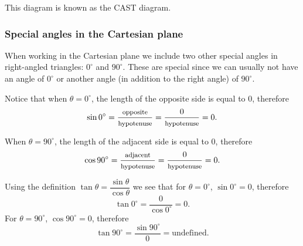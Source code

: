 This diagram is known as the CAST diagram.

\subsubsection{Special angles in the Cartesian plane}
When working in the Cartesian plane we include two other special
angles in right-angled triangles: $0^{\circ}$ and $90^{\circ}$. These
are special since we can usually not have an angle of $0^{\circ}$ or
another angle (in addition to the right angle) of $90^{\circ}$.

Notice that when $\theta = 0^{\circ}$, the length of the opposite side
is equal to $0$, therefore
\begin{equation*}
  \sin 0^{\circ} =
  \dfrac{\mbox{\footnotesize opposite}}{\mbox{\footnotesize hypotenuse}} =
  \dfrac{0}{\mbox{\footnotesize hypotenuse}} =
  0.
\end{equation*}

When $\theta = 90^{\circ}$, the length of the adjacent side is equal
to $0$, therefore
\begin{equation*}
  \cos 90^{\circ} =
  \dfrac{\mbox{\footnotesize adjacent}}{\mbox{\footnotesize hypotenuse}} =
  \dfrac{0}{\mbox{\footnotesize hypotenuse}} =
  0.
\end{equation*}

Using the definition $\tan \theta=\dfrac{\sin \theta}{\cos \theta}$ we
see that for $\theta =  0^{\circ}$, $\sin 0^{\circ}=0$, therefore
\begin{equation*}
  \tan 0^{\circ} =
  \dfrac{0}{\cos 0^{\circ}} =
  0.
\end{equation*}
For $\theta =  90^{\circ}$, $\cos 90^{\circ}=0$, therefore
\begin{equation*}
  \tan 90^{\circ} =
  \dfrac{\sin 90^{\circ}}{0} =
  \mbox{undefined.}
\end{equation*}

